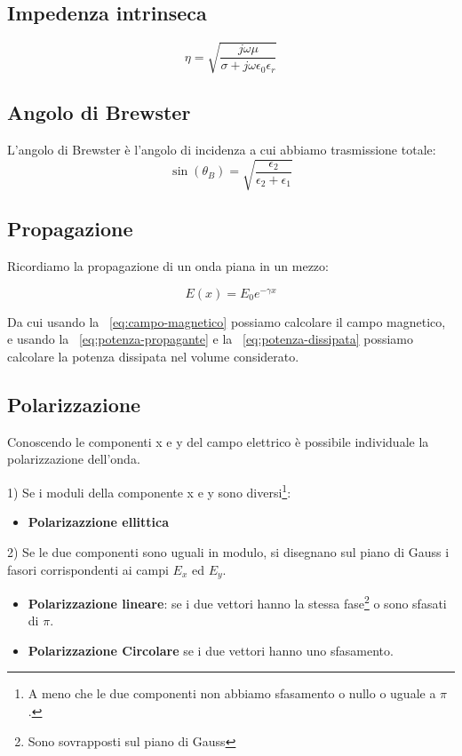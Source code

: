 	\subsection{Impedenza intrinseca}
		\begin{equation}
		\eta=\sqrt{\frac{j\omega\mu}{\sigma+j\omega\epsilon_0\epsilon_r}}
		\end{equation}
		

	\subsection{Angolo di Brewster}

	L'angolo di Brewster è l'angolo di incidenza a cui abbiamo trasmissione totale:
	\begin{equation}
	\sin(\theta_B)=\sqrt{\frac{\epsilon_2}{\epsilon_2+\epsilon_1}}
	\label{eq:brewster}
	\end{equation}




	\subsection{Propagazione}
	Ricordiamo la propagazione di un onda piana in un mezzo:
	

	\begin{equation}
	E(x)=E_0e^{-\gamma x}
	\end{equation}
	
	Da cui usando la ~\ref{eq:campo-magnetico} possiamo calcolare il campo magnetico, e usando la ~\ref{eq:potenza-propagante} e la ~\ref{eq:potenza-dissipata} possiamo calcolare la potenza dissipata nel volume considerato.


	\subsection{Polarizzazione}

	Conoscendo le componenti x e y del campo elettrico è possibile individuale la polarizzazione dell'onda.

	\raggedright	{1) Se i moduli della componente x e y sono diversi\footnote{A meno che le due componenti non abbiamo sfasamento o nullo o uguale a $\pi$.}:}

	\begin{itemize} 
	\item \textbf{Polarizazzione ellittica}
	\end{itemize}
	\raggedright{	2) Se le due componenti sono uguali in modulo, si disegnano sul piano di Gauss i fasori corrispondenti ai campi $E_x$ ed $E_y$.}
	\begin{itemize}
	\item \textbf{Polarizzazione lineare}: se i due vettori hanno la stessa fase\footnote{Sono sovrapposti sul piano di Gauss} o sono sfasati di $\pi$.
	\item \textbf{Polarizzazione Circolare} se i due vettori hanno uno sfasamento.
	\end{itemize}
		
